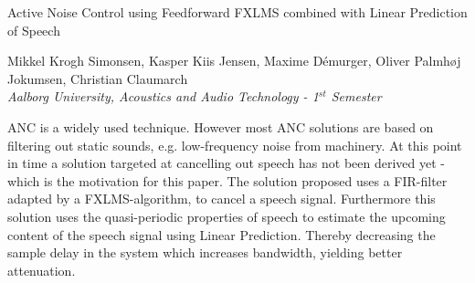 
\begin{center}
\begin{huge}
Active Noise Control using Feedforward FXLMS combined with Linear Prediction of Speech
\end{huge}

\vspace{5mm}
Mikkel Krogh Simonsen, Kasper Kiis Jensen, Maxime Démurger, Oliver Palmhøj Jokumsen, Christian Claumarch
\\
\textit{Aalborg University, Acoustics and Audio Technology - 1$^{st}$ Semester}


\vspace{5mm}

ANC is a widely used technique. However most ANC solutions are based on filtering out static sounds, e.g. low-frequency noise from machinery. At this point in time a solution targeted at cancelling out speech has not been derived yet - which is the motivation for this paper.
The solution proposed uses a FIR-filter adapted by a FXLMS-algorithm, to cancel a speech signal. Furthermore this solution uses the quasi-periodic properties of speech to estimate the upcoming content of the speech signal using Linear Prediction. Thereby decreasing the sample delay in the system which increases bandwidth, yielding better attenuation.
















\end{center}